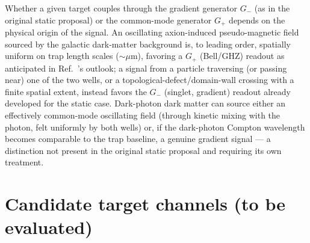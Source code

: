 \documentclass[aps,prxquantum,reprint,superscriptaddress,longbibliography]{revtex4-2}
\begin{document}
Whether a given target couples through the gradient generator $G_-$ (as in the original static
proposal) or the common-mode generator $G_+$ depends on the physical origin of the signal. An
oscillating axion-induced pseudo-magnetic field sourced by the galactic dark-matter background is, to
leading order, spatially uniform on trap length scales ($\sim\mu$m), favoring a $G_+$ (Bell/GHZ)
readout as anticipated in Ref.~\cite{perruzza2026}'s outlook; a signal from a particle traversing (or
passing near) one of the two wells, or a topological-defect/domain-wall crossing with a finite
spatial extent, instead favors the $G_-$ (singlet, gradient) readout already developed for the static
case. Dark-photon dark matter can source either an effectively common-mode oscillating field (through
kinetic mixing with the photon, felt uniformly by both wells) or, if the dark-photon Compton
wavelength becomes comparable to the trap baseline, a genuine gradient signal — a distinction not
present in the original static proposal and requiring its own treatment.

\section{Candidate target channels (to be evaluated)}
\label{sec:channels}
\end{document}
